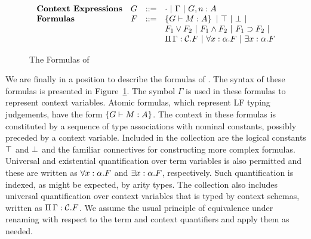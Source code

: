 \begin{figure}[tbhp]
\[\begin{array}{lrcl}
\mbox{\bf Context Expressions} & G & ::= &
    \emptyce\ |\ \Gamma\ |\ G,n:A\\
\mbox{\bf Formulas} & F & ::= & \fatm{G}{\of{M}{A}}\ |\ \ftrue\ |\ \ffalse\ |\\
& & & \myfor{F_1}{F_2}\ |\ \fand{F_1}{F_2}\ |\ \fimp{F_1}{F_2}\ |\\
& & &\fctx{\Gamma}{\mathcal{C}}{F}\ |\ \fall{x:\alpha}{F}\ |\ \fexists{x:\alpha}{F}
\end{array}\]
\caption{The Formulas of \logic}
\label{fig:formula-syntax}
\end{figure}

We are finally in a position to describe the formulas of \logic.
%
The syntax of these formulas is presented in
Figure~\ref{fig:formula-syntax}.
%
The symbol $\Gamma$ is used in these formulas to represent context
variables.
%
Atomic formulas, which represent LF typing judgements, have the form
$\left\{G \vdash M:A\right\}$.
%
The context in these formulas is constituted by a sequence of type
associations with nominal constants, possibly preceded by a context
variable.
%
Included in the collection are the logical constants $\top$ and
$\bot$ and the familiar connectives for constructing more complex
formulas.
%
Universal and existential quantification over term variables is also
permitted and these are written as $\forall x:\alpha. F$ and
$\exists x:\alpha. F$, respectively.
%
Such quantification is indexed, as might be expected, by arity types.
%
The collection also includes universal quantification over context
variables that is typed by context schemas, written as
$\Pi\,\Gamma : \mathcal{C}.F$.
%
We assume the usual principle of equivalence under renaming with
respect to the term and context quantifiers and apply them as needed. 

